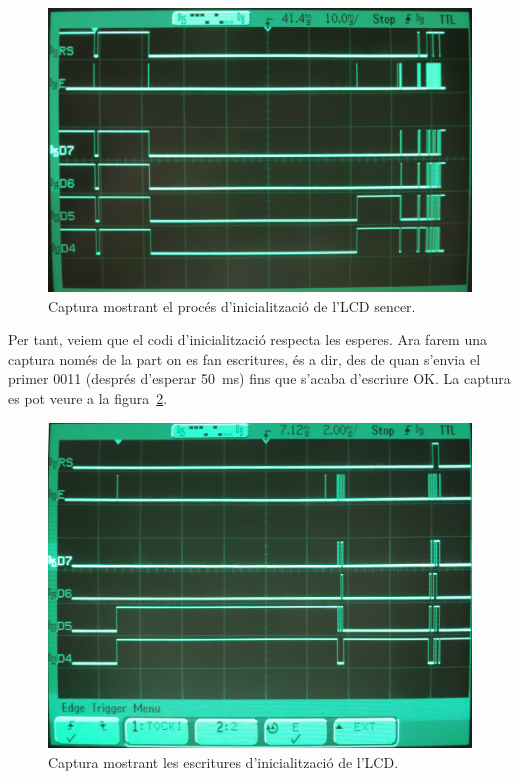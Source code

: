 \begin{figure}
  \includegraphics[width=.99\columnwidth]{../photos/analyzer/lcd-init-full-1}
  \caption{ \label{fig:p4-analyzer-lcd-init} Captura mostrant el procés d'inicialització de l'LCD sencer. }
\end{figure}

Per tant, veiem que el codi d'inicialització respecta les esperes. Ara farem una captura només de la part
on es fan escritures, és a dir, des de quan s'envia el primer 0011 (després d'esperar \SI{50}{\milli\second}) fins
que s'acaba d'escriure OK. La captura es pot veure a la figura~\ref{fig:p4-analyzer-lcd-protocol}.

\begin{figure}
  \includegraphics[width=.99\columnwidth]{../photos/analyzer/lcd-init-z1}
  \caption{ \label{fig:p4-analyzer-lcd-protocol} Captura mostrant les escritures d'inicialització de l'LCD. }
\end{figure}

